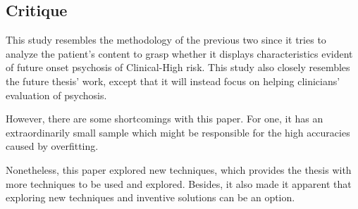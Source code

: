 \documentclass{Paper_Summary}
\begin{document}
\makepapertitle

\breakline

\begin{center}
    \section*{Critique}
\end{center}
    
    This study resembles the methodology of the previous two since it tries to analyze the patient's content to grasp whether it displays characteristics evident of future onset psychosis of Clinical-High risk. This study also closely resembles the future thesis' work, except that it will instead focus on helping clinicians' evaluation of psychosis.

    However, there are some shortcomings with this paper. For one, it has an extraordinarily small sample which might be responsible for the high accuracies caused by overfitting.

    Nonetheless, this paper explored new techniques, which provides the thesis with more techniques to be used and explored. Besides, it also made it apparent that exploring new techniques and inventive solutions can be an option.

\breakline
\end{document}
